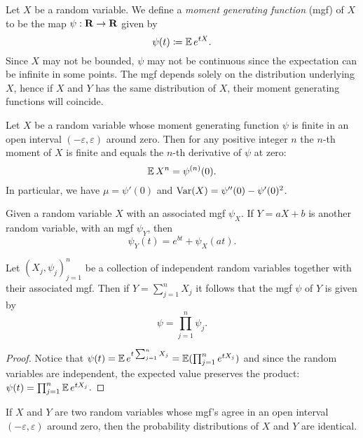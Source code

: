 \begin{definition}
\label{def:moment-generating-function}
Let \(X\) be a random variable. We define a \emph{moment generating function}
(mgf) of \(X\) to be the map \(\psi: \mathbf{R} \to \mathbf{R}\) given by
\[
\psi(t) \coloneq \operatorname{\mathbb{E}} e^{t X}.
\]
Since \(X\) may not be bounded, \(\psi\) may not be continuous since the
expectation can be infinite in some points. The mgf depends solely on the
distribution underlying \(X\), hence if \(X\) and \(Y\) has the same
distribution of \(X\), their moment generating functions will coincide.
\end{definition}

\begin{proposition}
\label{prop:moment-and-mgf}
Let \(X\) be a random variable whose moment generating function \(\psi\) is finite
in an open interval \((-\varepsilon, \varepsilon)\) around zero. Then for any positive integer
\(n\) the \(n\)-th moment of \(X\) is finite and equals the \(n\)-th derivative
of \(\psi\) at zero:
\[
\operatorname{\mathbb{E}} X^n = \psi^{(n)}(0).
\]
In particular, we have \(\mu = \psi'(0)\) and \(\operatorname{Var}(X) = \psi''(0) - \psi'(0)^2\).
\end{proposition}

\begin{proposition}
\label{prop:mgf-linear-combination}
Given a random variable \(X\) with an associated mgf \(\psi_X\). If \(Y = a X + b\)
is another random variable, with an mgf \(\psi_Y\), then
\[
\psi_Y(t) = e^{b t} + \psi_X(a t).
\]
\end{proposition}

\begin{proposition}
\label{prop:mgf-sum-random-variables}
Let \((X_j, \psi_j)_{j=1}^n\) be a collection of independent random variables
together with their associated mgf. Then if \(Y = \sum_{j=1}^n X_j\) it follows
that the mgf \(\psi\) of \(Y\) is given by
\[
\psi = \prod_{j=1}^n \psi_j.
\]
\end{proposition}

\begin{proof}
Notice that
\(\psi(t) = \operatorname{\mathbb{E}} e^{t\sum_{j=1}^n X_j} = \operatorname{\mathbb{E}}(\prod_{j=1}^n e^{t X_j})\) and since
the random variables are independent, the expected value preserves the product:
\(\psi(t) = \prod_{j=1}^n \operatorname{\mathbb{E}} e^{t X_j}\).
\end{proof}

\begin{theorem}
\label{thm:same-prob-distribution-if-mgfs-agree-around-zero}
If \(X\) and \(Y\) are two random variables whose mgf's agree in an open
interval \((-\varepsilon, \varepsilon)\) around zero, then the probability distributions of \(X\) and
\(Y\) are identical.
\end{theorem}

